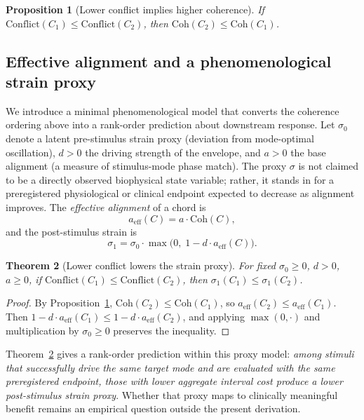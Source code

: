 \documentclass[11pt,a4paper]{article}
\newtheorem{theorem}{Theorem}
\newtheorem{proposition}[theorem]{Proposition}
\begin{document}
\begin{proposition}[Lower conflict implies higher coherence]
\label{prop:coherence-mono}
If\/ $\mathrm{Conflict}(C_1) \leq \mathrm{Conflict}(C_2)$, then
$\mathrm{Coh}(C_2) \leq \mathrm{Coh}(C_1)$.
\end{proposition}

\subsection{Effective alignment and a phenomenological strain proxy}

We introduce a minimal phenomenological model that converts the
coherence ordering above into a rank-order prediction about downstream
response. Let $\sigma_0$ denote a latent pre-stimulus strain proxy
(deviation from mode-optimal oscillation), $d > 0$ the driving strength
of the envelope, and $a > 0$ the base alignment (a measure of
stimulus-mode phase match). The proxy $\sigma$ is not claimed to be a
directly observed biophysical state variable; rather, it stands in for a
preregistered physiological or clinical endpoint expected to decrease as
alignment improves. The \emph{effective alignment} of a chord is
\begin{equation}
  \label{eq:eff-align}
  a_{\mathrm{eff}}(C) = a \cdot \mathrm{Coh}(C),
\end{equation}
and the post-stimulus strain is
\begin{equation}
  \label{eq:strain}
  \sigma_1 = \sigma_0 \cdot \max\!\big(0,\; 1 - d \cdot a_{\mathrm{eff}}(C)\big).
\end{equation}

\begin{theorem}[Lower conflict lowers the strain proxy]
\label{thm:strain}
For fixed $\sigma_0 \geq 0$, $d > 0$, $a \geq 0$, if\/
$\mathrm{Conflict}(C_1) \leq \mathrm{Conflict}(C_2)$, then
$\sigma_1(C_1) \leq \sigma_1(C_2)$.
\end{theorem}

\begin{proof}
By Proposition~\ref{prop:coherence-mono}, $\mathrm{Coh}(C_2) \leq
\mathrm{Coh}(C_1)$, so $a_{\mathrm{eff}}(C_2) \leq
a_{\mathrm{eff}}(C_1)$. Then $1 - d \cdot a_{\mathrm{eff}}(C_1)
\leq 1 - d \cdot a_{\mathrm{eff}}(C_2)$, and applying $\max(0,\cdot)$
and multiplication by $\sigma_0 \geq 0$ preserves the inequality.
\end{proof}

\noindent Theorem~\ref{thm:strain} gives a rank-order prediction within
this proxy model: \emph{among stimuli that successfully drive the same
target mode and are evaluated with the same preregistered endpoint,
those with lower aggregate interval cost produce a lower post-stimulus
strain proxy}. Whether that proxy maps to clinically meaningful benefit
remains an empirical question outside the present derivation.
\end{document}
